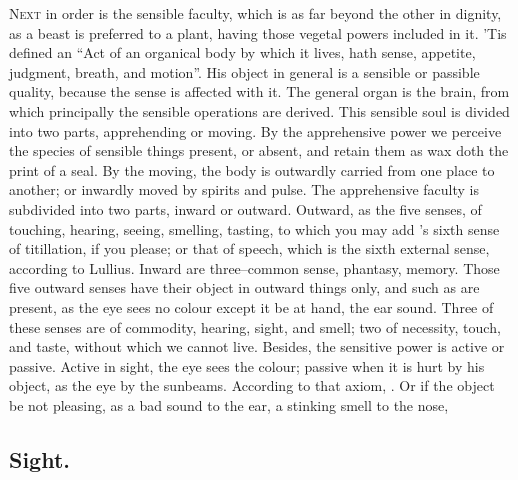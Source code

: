 \lettrine{N}{ext} in order is the sensible faculty, which is as far beyond the
other in dignity, as a beast is preferred to a plant, having those vegetal
powers included in it. 'Tis defined an \enquote{Act of an organical body by which it
lives, hath sense, appetite, judgment, breath, and motion}. His object in
general is a sensible or passible quality, because the sense is affected with
it. The general organ is the brain, from which principally the sensible
operations are derived. This sensible soul is divided into two parts,
apprehending or moving. By the apprehensive power we perceive the species of
sensible things present, or absent, and retain them as wax doth the print of a
seal. By the moving, the body is outwardly carried from one place to another;
or inwardly moved by spirits and pulse. The apprehensive faculty is subdivided
into two parts, inward or outward. Outward, as the five senses, of touching,
hearing, seeing, smelling, tasting, to which you may add \Scaliger{}'s sixth sense
of titillation, if you please; or that of speech, which is the sixth external
sense, according to Lullius. Inward are three--common sense, phantasy, memory.
Those five outward senses have their object in outward things only, and such as
are present, as the eye sees no colour except it be at hand, the ear sound.
Three of these senses are of commodity, hearing, sight, and smell; two of
necessity, touch, and taste, without which we cannot live. Besides, the
sensitive power is active or passive. Active in sight, the eye sees the colour;
passive when it is hurt by his object, as the eye by the sunbeams. According to
that axiom, . Or if
the object be not pleasing, as a bad sound to the ear, a stinking smell to the
nose, \etc{}

\subsection{Sight.}

